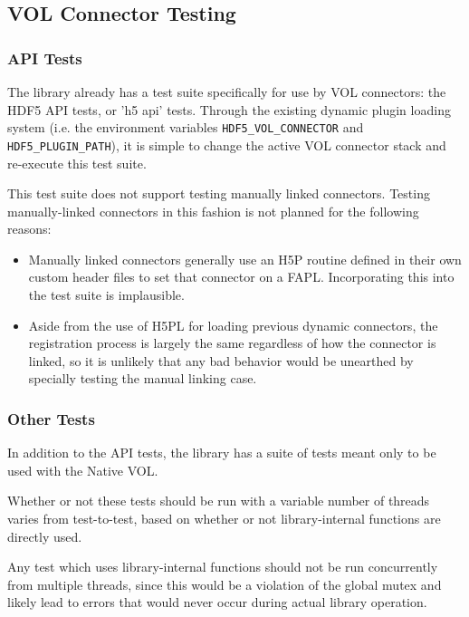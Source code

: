 \documentclass{article}
\begin{document}
\subsection{VOL Connector Testing}
\subsubsection{API Tests}

The library already has a test suite specifically for use by VOL connectors: the HDF5 API tests, or 'h5 api' tests. Through the existing dynamic plugin loading system (i.e. the environment variables \texttt{HDF5\_VOL\_CONNECTOR} and \texttt{HDF5\_PLUGIN\_PATH}), it is simple to change the active VOL connector stack and re-execute this test suite.

This test suite does not support testing manually linked connectors. Testing manually-linked connectors in this fashion is not planned for the following reasons:

\begin{itemize}
    \item Manually linked connectors generally use an H5P routine defined in their own custom header files to set that connector on a FAPL. Incorporating this into the test suite is implausible.

    \item Aside from the use of H5PL for loading previous dynamic connectors, the registration process is largely the same regardless of how the connector is linked, so it is unlikely that any bad behavior would be unearthed by specially testing the manual linking case.
\end{itemize}

\subsubsection{Other Tests}

In addition to the API tests, the library has a suite of tests meant only to be used with the Native VOL. 

Whether or not these tests should be run with a variable number of threads varies from test-to-test, based on whether or not library-internal functions are directly used.

Any test which uses library-internal functions should not be run concurrently from multiple threads, since this would be a violation of the global mutex and likely lead to errors that would never occur during actual library operation.
\end{document}

